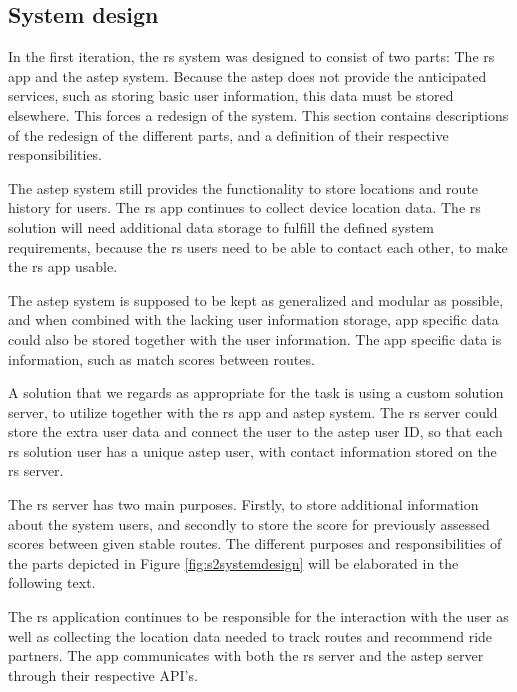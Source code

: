 \subsection{System design}
In the first iteration, the \gls{rs} system was designed to consist of two parts: The \gls{rs} app and the \gls{astep} system.
Because the \gls{astep} does not provide the anticipated services, such as storing basic user information, this data must be stored elsewhere.
This forces a redesign of the system.
This section contains descriptions of the redesign of the different parts, and a definition of their respective responsibilities.


The \gls{astep} system still provides the functionality to store locations and route history for users.
The \gls{rs} app continues to collect  device location data.  
The \gls{rs} solution will need additional data storage to fulfill the defined system requirements, because the \gls{rs} users need to be able to contact each other, to make the \gls{rs} app usable.


The \gls{astep} system is supposed to be kept as generalized and modular as possible, and when combined with the lacking user information storage, app specific data could also be stored together with the user information.
The app specific data is information, such as match scores between routes.


A solution that we regards as appropriate for the task is using a custom solution server, to utilize together with the \gls{rs} app and \gls{astep} system.
The \gls{rs} server could store the extra user data and connect the user to the \gls{astep} user ID, so that each \gls{rs} solution user has a unique \gls{astep} user, with contact information stored on the \gls{rs} server.


The \gls{rs} server has two main purposes.
Firstly, to store additional information about the system users, and secondly to store the score \todo{} for previously assessed scores \todo{} between given stable routes.
The different purposes and responsibilities of the parts depicted in Figure \ref{fig:s2systemdesign} will be elaborated in the following text.


The \gls{rs} application continues to be responsible for the interaction with the user as well as collecting the location data needed to track routes and recommend ride partners.
The app communicates with both the \gls{rs} server and the \gls{astep} server through their respective API's.


